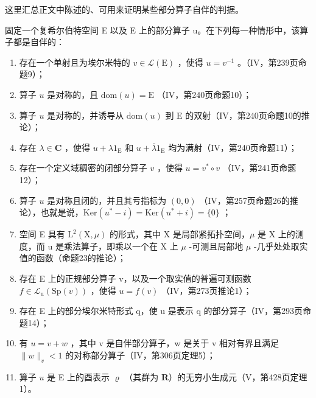 这里汇总正文中陈述的、可用来证明某些部分算子自伴的判据。

固定一个复希尔伯特空间 E 以及 E 上的部分算子 u。在下列每一种情形中，该算子都是自伴的：

\begin{enumerate}
\def\labelenumi{(\roman{enumi})}
\item
  存在一个单射且为埃尔米特的 \(v \in \mathcal{L}(\mathrm{E})\) ，使得 \(u = v^{-1}\) 。（IV，第239页命题9）；
\item
  算子 \(u\) 是对称的，且 \(\mathrm{dom}(u) = \mathrm{E}\) （IV，第240页命题10）；
\item
  算子 \(u\) 是对称的，并诱导从 \(\mathrm{dom}(u)\) 到 E 的双射（IV，第240页命题10的推论）；
\item
  存在 \(\lambda \in \mathbf{C}\) ，使得 \(u + \lambda 1_{\mathrm{E}}\) 和 \(u + \overline{\lambda} 1_{\mathrm{E}}\) 均为满射（IV，第240页命题11）；
\item
  存在一个定义域稠密的闭部分算子 \(v\) ，使得 \(u = v^{*} \circ v\) （IV，第241页命题12）；
\item
  算子 \(u\) 是对称且闭的，并且其亏指标为 \((0,0)\) （IV，第257页命题26的推论），也就是说，\(\mathrm{Ker}(u^{*} - i) = \mathrm{Ker}(u^{*} + i) = \{0\}\) ；
\item
  空间 E 具有 \(\mathrm{L}^{2}(\mathrm{X},\mu)\) 的形式，其中 X 是局部紧拓扑空间，\(\mu\) 是 X 上的测度，而 u 是乘法算子，即乘以一个在 X 上 \(\mu\) -可测且局部地 \(\mu\) -几乎处处取实值的函数（命题23的推论）；
\item
  存在 E 上的正规部分算子 v，以及一个取实值的普遍可测函数 \(f \in \mathcal{L}_{\mathrm{u}}(\mathrm{Sp}(v))\) ，使得 \(u = f(v)\) （IV，第273页推论1）；
\item
  存在 E 上的部分埃尔米特形式 q，使 u 是表示 q 的部分算子（IV，第293页命题14）；
\item
  有 \(u = v + w\) ，其中 v 是自伴部分算子，w 是关于 v 相对有界且满足 \(\|w\|_{v} < 1\) 的对称部分算子（IV，第306页定理5）；
\item
  算子 \(u\) 是 E 上的酉表示 \(\varrho\) （其群为 \(\mathbf{R}\)）的无穷小生成元（V，第428页定理1）。
\end{enumerate}
